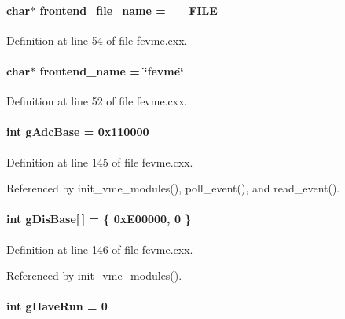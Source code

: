 \paragraph[{frontend\_\-file\_\-name}]{\setlength{\rightskip}{0pt plus 5cm}char$\ast$ {\bf frontend\_\-file\_\-name} = \_\-\_\-FILE\_\-\_\-}\hfill\label{fevme_8cxx_ac7fc683b5a25d9607abc270a54db6d97}


Definition at line 54 of file fevme.cxx.
\paragraph[{frontend\_\-name}]{\setlength{\rightskip}{0pt plus 5cm}char$\ast$ {\bf frontend\_\-name} = \char`\"{}fevme\char`\"{}}\hfill\label{fevme_8cxx_ac1f0c6df66e35778b61c611107501ec4}


Definition at line 52 of file fevme.cxx.
\paragraph[{gAdcBase}]{\setlength{\rightskip}{0pt plus 5cm}int {\bf gAdcBase} = 0x110000}\hfill\label{fevme_8cxx_ac373383d76046942f0c7d43a2837d633}


Definition at line 145 of file fevme.cxx.

Referenced by init\_\-vme\_\-modules(), poll\_\-event(), and read\_\-event().
\paragraph[{gDisBase}]{\setlength{\rightskip}{0pt plus 5cm}int {\bf gDisBase}\mbox{[}$\,$\mbox{]} = \{ 0xE00000, 0 \}}\hfill\label{fevme_8cxx_a2afa1f479a4a307f56717cfb87e8697c}


Definition at line 146 of file fevme.cxx.

Referenced by init\_\-vme\_\-modules().
\paragraph[{gHaveRun}]{\setlength{\rightskip}{0pt plus 5cm}int {\bf gHaveRun} = 0}\hfill\label{fevme_8cxx_ad732df322b26543b6debc58e32c257f7}


